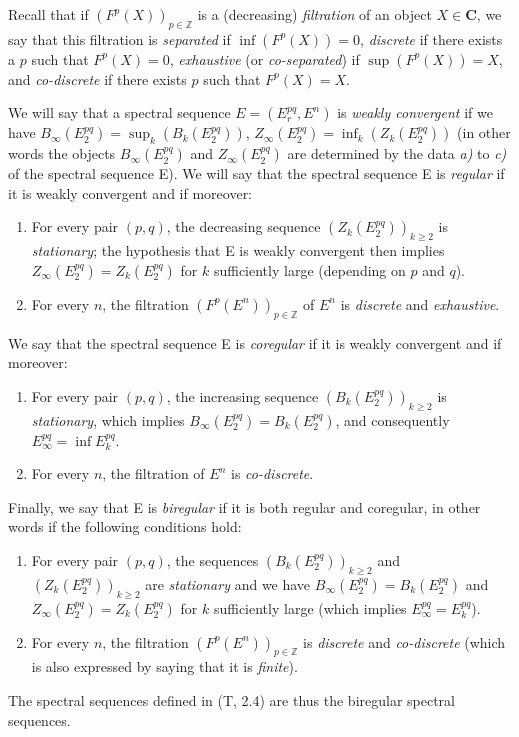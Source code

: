 \begin{env}[11.1.3]
\label{0.11.1.3}
Recall that if $(F^p(X))_{p\in\mathbb Z}$ is a (decreasing) \emph{filtration}
of an object $X\in\boldsymbol{C}$, we say that this filtration is \emph{separated}
if $\inf(F^p(X))=0$, \emph{discrete} if there exists a $p$ such that $F^p(X)=0$,
\emph{exhaustive} (or \emph{co-separated}) if $\sup(F^p(X))=X$, and
\emph{co-discrete} if there exists $p$ such that $F^p(X)=X$.

We will say that a spectral sequence $E=(E_r^{pq},E^n)$ is \emph{weakly
convergent} if we have $B_\infty(E_2^{pq})=\sup_k(B_k(E_2^{pq}))$,
$Z_\infty(E_2^{pq})=\inf_k(Z_k(E_2^{pq}))$
(in other words the objects $B_\infty(E_2^{pq})$ and $Z_\infty(E_2^{pq})$
are determined by the data \emph{a)} to \emph{c)} of the spectral sequence E). We will say
that the spectral sequence E is \emph{regular} if it is weakly
convergent and if moreover:
\begin{enumerate}
  \item[$1^\circ$] For every pair $(p,q)$, the decreasing sequence
    $(Z_k(E_2^{pq}))_{k\geq2}$ is \emph{stationary}; the hypothesis that E
    is weakly convergent then implies
    $Z_\infty(E_2^{pq})=Z_k(E_2^{pq})$ for $k$ sufficiently large (depending on
    $p$ and $q$).
  \item[$2^\circ$] For every $n$, the filtration
    $(F^p(E^n))_{p\in\mathbb Z}$ of $E^n$ is \emph{discrete} and
    \emph{exhaustive}.
\end{enumerate}

We say that the spectral sequence E is \emph{coregular} if it is
weakly convergent and if moreover:
\begin{enumerate}
  \item[$3^\circ$] For every pair $(p,q)$, the increasing sequence
    $(B_k(E_2^{pq}))_{k\geq2}$ is \emph{stationary}, which implies
    $B_\infty(E_2^{pq})=B_k(E_2^{pq})$, and consequently
    $E_\infty^{pq}=\inf E_k^{pq}$.
  \item[$4^\circ$] For every $n$, the filtration of $E^n$ is
    \emph{co-discrete}.
\end{enumerate}

Finally, we say that E is \emph{biregular} if it is both regular
and coregular, in other words if the following conditions hold:
\begin{enumerate}
  \item[\textit{a)}] For every pair $(p,q)$, the sequences
    $(B_k(E_2^{pq}))_{k\geq2}$ and $(Z_k(E_2^{pq}))_{k\geq2}$ are
    \emph{stationary} and we have
    $B_\infty(E_2^{pq})=B_k(E_2^{pq})$ and
    $Z_\infty(E_2^{pq})=Z_k(E_2^{pq})$ for $k$ sufficiently large (which implies
    $E_\infty^{pq}=E_k^{pq}$).
  \item[\textit{b)}] For every $n$, the filtration $(F^p(E^n))_{p\in\mathbb Z}$ is
    \emph{discrete} and \emph{co-discrete} (which is also expressed by saying
    that it is \emph{finite}).
\end{enumerate}

The spectral sequences defined in (T, 2.4) are thus the biregular
spectral sequences.
\end{env}

